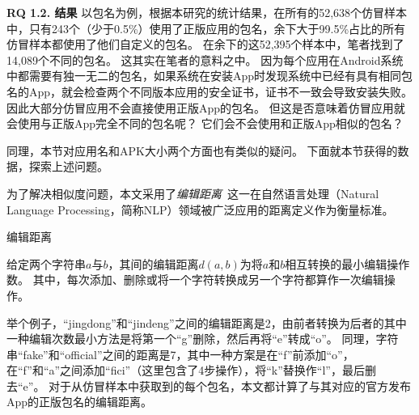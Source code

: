 {\bf RQ 1.2. 结果}
以包名为例，根据本研究的统计结果，在所有的52,638个仿冒样本中，只有243个（少于0.5\%）使用了正版应用的包名，余下大于99.5\%占比的所有仿冒样本都使用了他们自定义的包名。
在余下的这52,395个样本中，笔者找到了14,089个不同的包名。
这其实在笔者的意料之中。
因为每个应用在Android系统中都需要有独一无二的包名，如果系统在安装App时发现系统中已经有具有相同包名的App，就会检查两个不同版本应用的安全证书，证书不一致会导致安装失败。
因此大部分仿冒应用不会直接使用正版App的包名。
但这是否意味着仿冒应用就会使用与正版App完全不同的包名呢？
它们会不会使用和正版App相似的包名？

同理，本节对应用名和APK大小两个方面也有类似的疑问。
下面就本节获得的数据，探索上述问题。

为了解决相似度问题，本文采用了\textit{编辑距离}~\cite{levenshtein1966binary}这一在自然语言处理（Natural Language Processing，简称NLP）领域被广泛应用的距离定义作为衡量标准。

\begin{Def}
	编辑距离

	给定两个字符串$a$与$b$，其间的编辑距离$d(a, b)$为将$a$和$b$相互转换的最小编辑操作数。
	其中，每次添加、删除或将一个字符转换成另一个字符都算作一次编辑操作。
\end{Def}

举个例子，``jingdong''和``jindeng''之间的编辑距离是2，由前者转换为后者的其中一种编辑次数最小方法是将第一个``g''删除，然后再将``e''转成``o''。
同理，字符串``fake''和``official''之间的距离是7，其中一种方案是在``f''前添加``o''，在``f''和``a''之间添加``fici''（这里包含了4步操作），将``k''替换作``l''，最后删去``e''。
对于从仿冒样本中获取到的每个包名，本文都计算了与其对应的官方发布App的正版包名的编辑距离。

